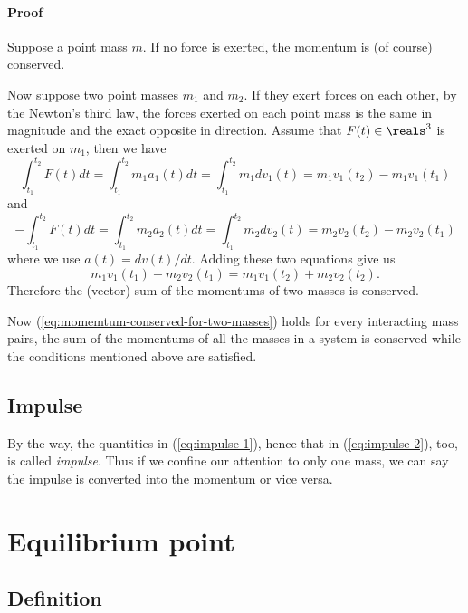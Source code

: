\documentclass{article}
\begin{document}
\paragraph{Proof}

Suppose a point mass $m$.
If no force is exerted, the momentum is (of course) conserved.

Now suppose two point masses $m_1$ and $m_2$.
If they exert forces on each other,
by the Newton's third law,
the forces exerted on each point mass
is the same in magnitude and the exact opposite in direction.
Assume that $F(t)\in\reals^3$ is exerted on $m_1$, then we have
\begin{equation}
\label{eq:impulse-1}
	\int_{t_1}^{t_2} F(t) dt
= \int_{t_1}^{t_2} m_1 a_1(t) dt
= \int_{t_1}^{t_2} m_1 dv_1(t)
= m_1v_1(t_2) - m_1 v_1(t_1)
\end{equation}
and
\begin{equation}
\label{eq:impulse-2}
	-\int_{t_1}^{t_2} F(t) dt
= \int_{t_1}^{t_2} m_2 a_2(t) dt
= \int_{t_1}^{t_2} m_2 dv_2(t)
= m_2v_2(t_2) - m_2 v_2(t_1)
\end{equation}
where we use $a(t) = dv(t) / dt$.
Adding these two equations give us
\begin{equation}
\label{eq:momemtum-conserved-for-two-masses}
m_1v_1(t_1) + m_2v_2(t_1)
=
m_1v_1(t_2) + m_2v_2(t_2).
\end{equation}
Therefore the (vector) sum of the momentums of two masses is conserved.

Now (\ref{eq:momemtum-conserved-for-two-masses}) holds for every interacting mass pairs,
the sum of the momentums of all the masses in a system is conserved
while the conditions mentioned above are satisfied.

\subsection{Impulse}

By the way, the quantities in (\ref{eq:impulse-1}), hence that in (\ref{eq:impulse-2}), too,
is called \emph{impulse}.
Thus if we confine our attention to only one mass,
we can say the impulse is converted into the momentum or vice versa.


\section{Equilibrium point}

\subsection{Definition}
\end{document}
